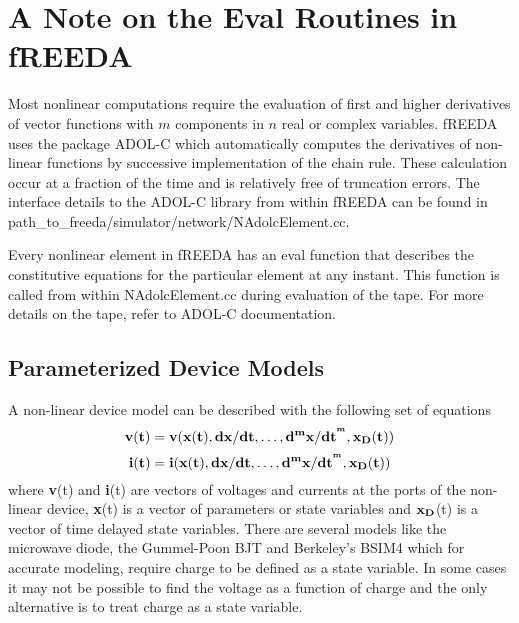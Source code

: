 \section{A Note on the Eval Routines in fREEDA}

\noindent Most nonlinear computations require the evaluation of first and higher
derivatives of vector functions with $m$ components in $n$ real or complex
variables. fREEDA uses the package ADOL-C which automatically
computes the derivatives of non-linear functions by successive implementation
of the chain rule. These calculation occur at a fraction of the time and is
relatively free of truncation errors. The interface details to the ADOL-C
library from within fREEDA can be found in
path\_to\_freeda/simulator/network/NAdolcElement.cc.

Every nonlinear element in fREEDA has an eval function that describes the
constitutive equations for the particular element at any instant. This
function is called from within NAdolcElement.cc during evaluation of the tape.
For more details on the tape,  refer to ADOL-C documentation.

\subsection{Parameterized Device Models}

A non-linear device model can be described with the following set of equations
\begin{equation}
  \bf{v} ( t ) = \bf{v} ( x ( t ), dx / dt, \ldots,
  d^m x / dt^{^m}, x_D ( t ))
\end{equation}
\begin{equation}
  \bf{i} ( t ) = \bf{i} ( x ( t ), dx / dt, \ldots,
  d^m x / dt^{^m}, x_D ( t ))
\end{equation}
where \textbf{v}(t) and \textbf{i}(t) are vectors of voltages and currents at
the ports of the non-linear device, \textbf{x}(t) is a vector of parameters or
state variables and $\bf{x_D}$(t) is a vector of time delayed state
variables. There are several models like the microwave diode, the Gummel-Poon
BJT and Berkeley's BSIM4 which for accurate modeling, require charge to be
defined as a state variable. In some cases it may not be possible to find the
voltage as a function of charge and the only alternative is to treat charge as
a state variable.

